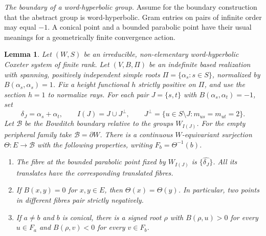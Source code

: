 \documentclass[11pt,reqno]{amsart}
\theoremstyle{plain}
\newtheorem{lemma}[theorem]{Lemma}
\theoremstyle{definition}
\theoremstyle{remark}
\numberwithin{equation}{section}
\begin{document}
\par\medskip
\noindent\emph{The boundary of a word-hyperbolic group.}
Assume for the boundary construction that the abstract group is word-hyperbolic. Gram entries on pairs of infinite order may equal $-1$. A conical point and a bounded parabolic point have their usual meanings for a geometrically finite convergence action.

\begin{lemma}\label{p14:coding}
Let $(W,S)$ be an irreducible, non-elementary word-hyperbolic Coxeter
system of finite rank. Let $(V,B,\Pi)$ be an indefinite based
realization with spanning, positively independent simple roots
$\Pi=\{\alpha_s:s\in S\}$, normalized by $B(\alpha_s,\alpha_s)=1$.
Fix a height functional $h$ strictly positive on $\Pi$, and use the
section $h=1$ to normalize rays. For each pair
$J=\{s,t\}$ with $B(\alpha_s,\alpha_t)=-1$, set
\[
  \delta_J=\alpha_s+\alpha_t,\qquad
  I(J)=J\cup J^\perp,\qquad
  J^\perp=\{u\in S\setminus J: m_{us}=m_{ut}=2\}.
\]
Let $\mathcal B$ be the Bowditch boundary relative to the groups
$W_{I(J)}$. For the empty peripheral family take
$\mathcal B=\partial W$. There is a continuous $W$-equivariant
surjection $\Theta:E\longrightarrow\mathcal B$ with the following
properties, writing $F_b=\Theta^{-1}(b)$.
\begin{enumerate}
\item The fibre at the bounded parabolic point fixed by $W_{I(J)}$
is $\{\widehat{\delta_J}\}$. All its translates have the corresponding
translated fibres.
\item If $B(x,y)=0$ for $x,y\in E$, then $\Theta(x)=\Theta(y)$.
In particular, two points in different fibres pair strictly negatively.
\item If $a\ne b$ and $b$ is conical, there is a signed root $\rho$
with $B(\rho,u)>0$ for every $u\in F_a$ and $B(\rho,v)<0$ for
every $v\in F_b$.
\end{enumerate}
\end{lemma}
\end{document}
